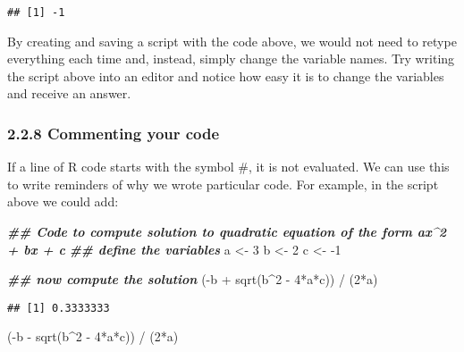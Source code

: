 \documentclass[
]{article}
\newenvironment{Shaded}{\begin{snugshade}}{\end{snugshade}}
\newcommand{\DecValTok}[1]{\textcolor[rgb]{0.00,0.00,0.81}{#1}}
\newcommand{\DocumentationTok}[1]{\textcolor[rgb]{0.56,0.35,0.01}{\textbf{\textit{#1}}}}
\newcommand{\FunctionTok}[1]{\textcolor[rgb]{0.00,0.00,0.00}{#1}}
\newcommand{\NormalTok}[1]{#1}
\newcommand{\OtherTok}[1]{\textcolor[rgb]{0.56,0.35,0.01}{#1}}
\newcommand{\SpecialCharTok}[1]{\textcolor[rgb]{0.00,0.00,0.00}{#1}}
\begin{document}
\begin{verbatim}
## [1] -1
\end{verbatim}

By creating and saving a script with the code above, we would not need
to retype everything each time and, instead, simply change the variable
names. Try writing the script above into an editor and notice how easy
it is to change the variables and receive an answer.

\hypertarget{commenting-your-code}{%
\subsubsection{2.2.8 Commenting your code}\label{commenting-your-code}}

If a line of R code starts with the symbol \#, it is not evaluated. We
can use this to write reminders of why we wrote particular code. For
example, in the script above we could add:

\begin{Shaded}
\begin{Highlighting}[]
\DocumentationTok{\#\# Code to compute solution to quadratic equation of the form ax\^{}2 + bx + c}
\DocumentationTok{\#\# define the variables}
\NormalTok{a }\OtherTok{\textless{}{-}} \DecValTok{3} 
\NormalTok{b }\OtherTok{\textless{}{-}} \DecValTok{2}
\NormalTok{c }\OtherTok{\textless{}{-}} \SpecialCharTok{{-}}\DecValTok{1}

\DocumentationTok{\#\# now compute the solution}
\NormalTok{(}\SpecialCharTok{{-}}\NormalTok{b }\SpecialCharTok{+} \FunctionTok{sqrt}\NormalTok{(b}\SpecialCharTok{\^{}}\DecValTok{2} \SpecialCharTok{{-}} \DecValTok{4}\SpecialCharTok{*}\NormalTok{a}\SpecialCharTok{*}\NormalTok{c)) }\SpecialCharTok{/}\NormalTok{ (}\DecValTok{2}\SpecialCharTok{*}\NormalTok{a)}
\end{Highlighting}
\end{Shaded}

\begin{verbatim}
## [1] 0.3333333
\end{verbatim}

\begin{Shaded}
\begin{Highlighting}[]
\NormalTok{(}\SpecialCharTok{{-}}\NormalTok{b }\SpecialCharTok{{-}} \FunctionTok{sqrt}\NormalTok{(b}\SpecialCharTok{\^{}}\DecValTok{2} \SpecialCharTok{{-}} \DecValTok{4}\SpecialCharTok{*}\NormalTok{a}\SpecialCharTok{*}\NormalTok{c)) }\SpecialCharTok{/}\NormalTok{ (}\DecValTok{2}\SpecialCharTok{*}\NormalTok{a)}
\end{Highlighting}
\end{Shaded}
\end{document}
